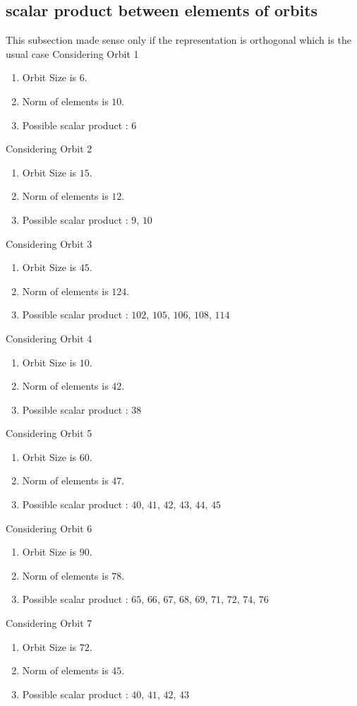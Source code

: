 \documentclass[12pt]{article}
\begin{document}
\subsection{scalar product between elements of orbits}
\noindent This subsection made sense only if the representation is orthogonal which is the usual case
Considering Orbit 1
\begin{enumerate}
\item Orbit Size is $6$.
\item Norm of elements is $10$.
\item Possible scalar product : $6$
\end{enumerate}
Considering Orbit 2
\begin{enumerate}
\item Orbit Size is $15$.
\item Norm of elements is $12$.
\item Possible scalar product : $9$, $10$
\end{enumerate}
Considering Orbit 3
\begin{enumerate}
\item Orbit Size is $45$.
\item Norm of elements is $124$.
\item Possible scalar product : $102$, $105$, $106$, $108$, $114$
\end{enumerate}
Considering Orbit 4
\begin{enumerate}
\item Orbit Size is $10$.
\item Norm of elements is $42$.
\item Possible scalar product : $38$
\end{enumerate}
Considering Orbit 5
\begin{enumerate}
\item Orbit Size is $60$.
\item Norm of elements is $47$.
\item Possible scalar product : $40$, $41$, $42$, $43$, $44$, $45$
\end{enumerate}
Considering Orbit 6
\begin{enumerate}
\item Orbit Size is $90$.
\item Norm of elements is $78$.
\item Possible scalar product : $65$, $66$, $67$, $68$, $69$, $71$, $72$, $74$, $76$
\end{enumerate}
Considering Orbit 7
\begin{enumerate}
\item Orbit Size is $72$.
\item Norm of elements is $45$.
\item Possible scalar product : $40$, $41$, $42$, $43$
\end{enumerate}
\end{document}
